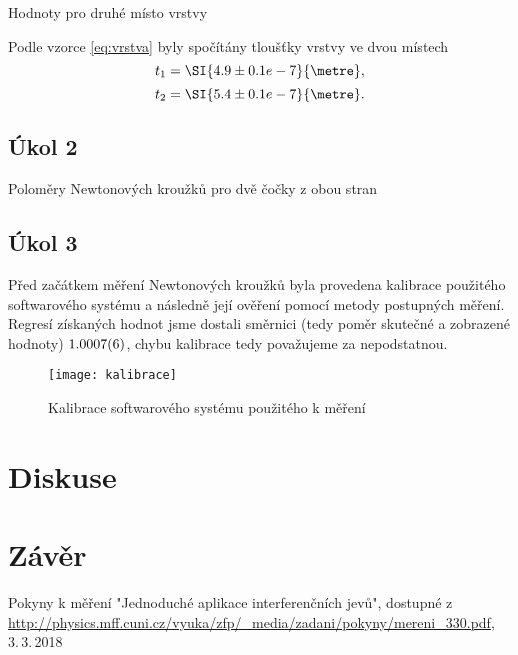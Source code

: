 \documentclass{protokol}
\begin{document}
      \begin{table}[H]
        \centering
        \setlength{\tabcolsep}{10pt}
        
        \caption{Hodnoty pro druhé místo vrstvy}
        \label{tab:vrstva2}
      \end{table}

      Podle vzorce \eqref{eq:vrstva} byly spočítány tloušťky vrstvy ve dvou místech
      $$ t_1 = \SI{4.9 \pm 0.1 e-7}{\metre}, $$
      $$ t_2 = \SI{5.4 \pm 0.1 e-7}{\metre}. $$
    
    \subsection*{Úkol 2}

      \begin{table}[H]
        \centering
        \setlength{\tabcolsep}{10pt}
        
        \caption{Poloměry Newtonových kroužků pro dvě čočky z obou stran}
        \label{tab:newton}
      \end{table}

    \subsection*{Úkol 3}
      
      Před začátkem měření Newtonových kroužků byla provedena kalibrace použitého softwarového systému a následně její ověření pomocí metody postupných měření. Regresí získaných hodnot jsme dostali směrnici (tedy poměr skutečné a zobrazené hodnoty) $\SI{1.0007 \pm 0.0006}{}$, chybu kalibrace tedy považujeme za nepodstatnou. 

      \begin{figure}[H]
        \centering
        \texttt{[image: kalibrace]}
        \caption{Kalibrace softwarového systému použitého k měření}
        \label{fig:u4s}
      \end{figure}

  \section*{Diskuse}

  \section*{Závěr}
    
  \begin{thebibliography}{}

    Pokyny k měření "Jednoduché aplikace interferenčních jevů", dostupné z\\ \url{http://physics.mff.cuni.cz/vyuka/zfp/_media/zadani/pokyny/mereni_330.pdf}, 3.\,3.\,2018
  
  \end{thebibliography}
\end{document}
